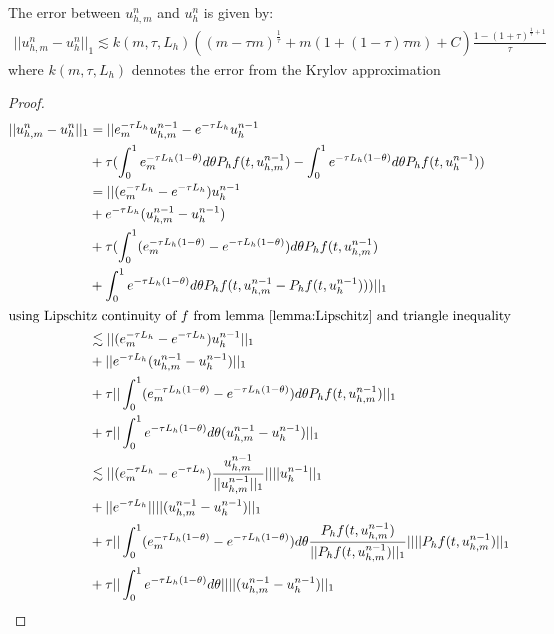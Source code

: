 \begin{lemma}
    The error between $u_{h,m}^n$ and $u_{h}^n$ is given by:
    \begin{align*}
        ||u_{h,m}^n - u_{h}^n||_1 \lesssim k(m,\tau, L_h)((m-\tau m)^\frac{1}{\tau} + m (1 + (1 - \tau)\tau m) + C)\frac{1-(1+\tau)^{\frac{1}{\tau} + 1}}{\tau}
    \end{align*}
    where $k(m,\tau,L_h)$ dennotes the error from the Krylov approximation
\end{lemma}
\begin{proof}
    \begin{align*}
        ||u_{h,m}^n - u_{h}^n||_1 &= ||e_m^{-\tau L_h}u_{h,m}^{n-1} - e^{-\tau L_h}u_{h}^{n-1}\\
        & + \tau(\int^1_0e_m^{-\tau L_h(1-\theta)}d\theta P_hf(t, u_{h,m}^{n-1}) - \int^1_0e^{-\tau L_h(1-\theta)}d\theta P_hf(t, u_{h}^{n-1}))\\
        &= ||(e_m^{-\tau L_h}-e^{-\tau L_h})u_{h}^{n-1} \\
        & + e^{-\tau L_h}(u_{h,m}^{n-1}-u_{h}^{n-1})\\
        & + \tau(\int^1_0 (e_m^{-\tau L_h(1-\theta)}-e^{-\tau L_h(1-\theta)}) d\theta P_hf(t, u_{h,m}^{n-1})\\
        & + \int^1_0e^{-\tau L_h(1-\theta)}d\theta P_hf(t, u_{h,m}^{n-1}- P_hf(t, u_{h}^{n-1})))||_1\\
        \intertext{using Lipschitz continuity of $f$ from lemma \ref{lemma:Lipschitz} and triangle inequality}
        & \lesssim ||(e_m^{-\tau L_h}-e^{-\tau L_h})u_{h}^{n-1}||_1 \\
        & + ||e^{-\tau L_h}(u_{h,m}^{n-1}-u_{h}^{n-1})||_1 \\
        & + \tau||\int^1_0 (e_m^{-\tau L_h(1-\theta)}-e^{-\tau L_h(1-\theta)}) d\theta P_hf(t, u_{h,m}^{n-1})||_1 \\
        & + \tau||\int^1_0e^{-\tau L_h(1-\theta)}d\theta (u_{h,m}^{n-1}- u_{h}^{n-1})||_1 \\
        & \lesssim ||(e_m^{-\tau L_h}-e^{-\tau L_h})\frac{u_{h,m}^{n-1}}{||u_{h,m}^{n-1}||_1}||||u_{h}^{n-1}||_1 \\
        & + ||e^{-\tau L_h}||||(u_{h,m}^{n-1}-u_{h}^{n-1})||_1 \\
        & + \tau||\int^1_0 (e_m^{-\tau L_h(1-\theta)}-e^{-\tau L_h(1-\theta)}) d\theta \frac{P_hf(t, u_{h,m}^{n-1})}{|| P_hf(t, u_{h,m}^{n-1})||_1}|||| P_hf(t, u_{h,m}^{n-1})||_1 \\
        & + \tau||\int^1_0e^{-\tau L_h(1-\theta)}d\theta|||| (u_{h,m}^{n-1}- u_{h}^{n-1})||_1 \\

\end{align*}
\end{proof}
